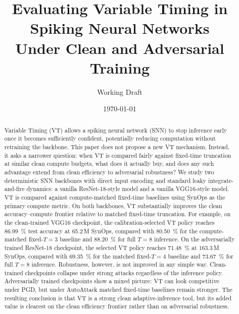 \documentclass[11pt]{article}
\title{Evaluating Variable Timing in Spiking Neural Networks\\Under Clean and Adversarial Training}
\author{Working Draft}
\date{\today}
\begin{document}
\maketitle

\begin{abstract}
Variable Timing (VT) allows a spiking neural network (SNN) to stop inference early once it becomes sufficiently confident, potentially reducing computation without retraining the backbone. This paper does not propose a new VT mechanism. Instead, it asks a narrower question: when VT is compared fairly against fixed-time truncation at similar clean compute budgets, what does it actually buy, and does any such advantage extend from clean efficiency to adversarial robustness? We study two deterministic SNN backbones with direct input encoding and standard leaky integrate-and-fire dynamics: a vanilla ResNet-18-style model and a vanilla VGG16-style model. VT is compared against compute-matched fixed-time baselines using SynOps as the primary compute metric. On both backbones, VT substantially improves the clean accuracy--compute frontier relative to matched fixed-time truncation. For example, on the clean-trained VGG16 checkpoint, the calibration-selected VT policy reaches \SI{86.99}{\percent} test accuracy at \num{65.2}\,M SynOps, compared with \SI{80.50}{\percent} for the compute-matched fixed-$T=3$ baseline and \SI{88.20}{\percent} for full $T=8$ inference. On the adversarially trained ResNet-18 checkpoint, the selected VT policy reaches \SI{71.48}{\percent} at \num{163.3}\,M SynOps, compared with \SI{69.35}{\percent} for the matched fixed-$T=4$ baseline and \SI{73.67}{\percent} for full $T=8$ inference. Robustness, however, is not improved in any simple way. Clean-trained checkpoints collapse under strong attacks regardless of the inference policy. Adversarially trained checkpoints show a mixed picture: VT can look competitive under PGD, but under AutoAttack matched fixed-time baselines remain stronger. The resulting conclusion is that VT is a strong clean adaptive-inference tool, but its added value is clearest on the clean efficiency frontier rather than on adversarial robustness.
\end{abstract}
\end{document}
